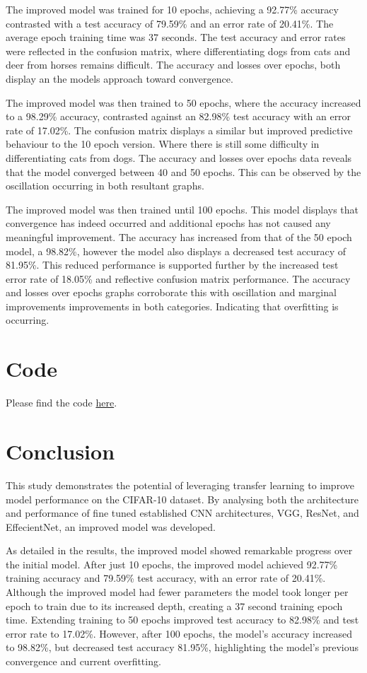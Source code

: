 \documentclass[10pt,twocolumn,letterpaper]{article}
\begin{document}
The improved model was trained for 10 epochs, achieving a 92.77\% accuracy contrasted with a test accuracy of 79.59\% and an error rate of 20.41\%. The average epoch training time was 37 seconds. The test accuracy and error rates were reflected in the confusion matrix, where differentiating dogs from cats and deer from horses remains difficult. The accuracy and losses over epochs, both display an the models approach toward convergence.

The improved model was then trained to 50 epochs, where the accuracy increased to a  98.29\% accuracy, contrasted against an 82.98\% test accuracy with an error rate of 17.02\%. The confusion matrix displays a similar but improved predictive behaviour to the 10 epoch version. Where there is still some difficulty in differentiating cats from dogs. The accuracy and losses over epochs data reveals that the model converged between 40 and 50 epochs. This can be observed by the oscillation occurring in both resultant graphs.

The improved model was then trained until 100 epochs. This model displays that convergence has indeed occurred and additional epochs has not caused any meaningful improvement. The accuracy has increased from that of the 50 epoch model, a 98.82\%, however the model also displays a decreased test accuracy of 81.95\%. This reduced performance is supported further by the increased test error rate of 18.05\% and reflective confusion matrix performance. The accuracy and losses over epochs graphs corroborate this with oscillation and marginal improvements improvements in both categories. Indicating that overfitting is occurring.

\section{Code}
\label{sec:code}
Please find the code \href{https://github.com/Drackonack/DLF_Assignment_02}{here}.

\section{Conclusion}
\label{sec:conclusion}
This study demonstrates the potential of leveraging transfer learning to improve model performance on the CIFAR-10 dataset. By analysing both the architecture and performance of fine tuned established CNN architectures, VGG, ResNet, and EffecientNet, an improved model was developed. 

As detailed in the results, the improved model showed remarkable progress over the initial model. After just 10 epochs, the improved model achieved 92.77\% training accuracy and 79.59\% test accuracy, with an error rate of 20.41\%. Although the improved model had fewer parameters the model took longer per epoch to train due to its increased depth, creating a 37 second training epoch time. Extending training to 50 epochs improved test accuracy to 82.98\% and test error rate to 17.02\%. However, after 100 epochs, the model’s accuracy increased to 98.82\%, but decreased test accuracy 81.95\%, highlighting the model's previous convergence and current overfitting.
\end{document}
